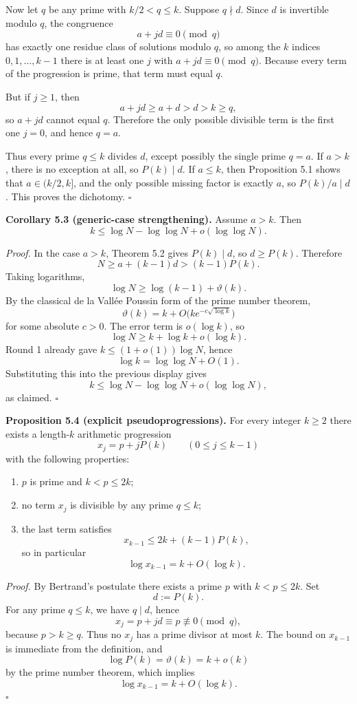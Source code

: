 Now let $q$ be any prime with $k/2<q\le k$.  Suppose $q\nmid d$.  Since $d$ is invertible modulo $q$, the congruence
\[
a+jd\equiv 0\pmod q
\]
has exactly one residue class of solutions modulo $q$, so among the $k$ indices $0,1,\dots,k-1$ there is at least one $j$ with $a+jd\equiv 0\pmod q$.  Because every term of the progression is prime, that term must equal $q$.

But if $j\ge 1$, then
\[
a+jd\ge a+d>d>k\ge q,
\]
so $a+jd$ cannot equal $q$.  Therefore the only possible divisible term is the first one $j=0$, and hence $q=a$.

Thus every prime $q\le k$ divides $d$, except possibly the single prime $q=a$.
If $a>k$, there is no exception at all, so $P(k)\mid d$.
If $a\le k$, then Proposition 5.1 shows that $a\in (k/2,k]$, and the only possible missing factor is exactly $a$, so $P(k)/a\mid d$.
This proves the dichotomy. \hfill$\square$

\medskip
\noindent\textbf{Corollary 5.3 (generic-case strengthening).}
Assume $a>k$.  Then
\[
k\le \log N-\log\log N+o(\log\log N).
\]

\smallskip
\noindent\emph{Proof.}
In the case $a>k$, Theorem 5.2 gives $P(k)\mid d$, so $d\ge P(k)$.  Therefore
\[
N\ge a+(k-1)d>(k-1)P(k).
\]
Taking logarithms,
\[
\log N\ge \log(k-1)+\vartheta(k).
\]
By the classical de la Vall\'ee Poussin form of the prime number theorem,
\[
\vartheta(k)=k+O\bigl(k e^{-c\sqrt{\log k}}\bigr)
\]
for some absolute $c>0$.  The error term is $o(\log k)$, so
\[
\log N\ge k+\log k+o(\log k).
\]
Round 1 already gave $k\le (1+o(1))\log N$, hence
\[
\log k=\log\log N+O(1).
\]
Substituting this into the previous display gives
\[
k\le \log N-\log\log N+o(\log\log N),
\]
as claimed. \hfill$\square$

\medskip
\noindent\textbf{Proposition 5.4 (explicit pseudoprogressions).}
For every integer $k\ge 2$ there exists a length-$k$ arithmetic progression
\[
x_j=p+jP(k)\qquad (0\le j\le k-1)
\]
with the following properties:
\begin{enumerate}
\item $p$ is prime and $k<p\le 2k$;
\item no term $x_j$ is divisible by any prime $q\le k$;
\item the last term satisfies
\[
x_{k-1}\le 2k+(k-1)P(k),
\]
so in particular
\[
\log x_{k-1}=k+O(\log k).
\]
\end{enumerate}

\smallskip
\noindent\emph{Proof.}
By Bertrand's postulate there exists a prime $p$ with $k<p\le 2k$.
Set
\[
d:=P(k).
\]
For any prime $q\le k$, we have $q\mid d$, hence
\[
x_j=p+j d\equiv p\not\equiv 0\pmod q,
\]
because $p>k\ge q$.  Thus no $x_j$ has a prime divisor at most $k$.
The bound on $x_{k-1}$ is immediate from the definition, and
\[
\log P(k)=\vartheta(k)=k+o(k)
\]
by the prime number theorem, which implies
\[
\log x_{k-1}=k+O(\log k).
\]
\hfill$\square$

